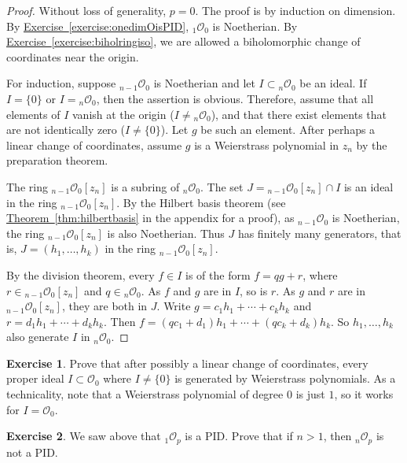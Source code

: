\documentclass[12pt,openany]{book}
\newcommand{\sO}{{\mathscr{O}}}
\theoremstyle{plain}
\theoremstyle{remark}
\theoremstyle{definition}
\newenvironment{exbox}{%
    \def\FrameCommand{\vrule width 1pt \relax\hspace{10pt}}%
    \MakeFramed{\advance\hsize-\width\FrameRestore}%
}{%
    \endMakeFramed
}
\theoremstyle{exercise}
\newtheorem{exercise}{Exercise}[section]
\theoremstyle{example}
\newcommand{\exerciseref}[1]{\hyperref[#1]{Exercise~\ref*{#1}}}
\newcommand{\thmref}[1]{\hyperref[#1]{Theorem~\ref*{#1}}}
\begin{document}
\begin{proof}
Without loss of generality, $p=0$.
The proof is by induction on dimension.
By \exerciseref{exercise:onedimOisPID}, ${}_1\sO_0$ is Noetherian.
By \exerciseref{exercise:biholringiso}, we are allowed a
biholomorphic change of coordinates near the origin.

For induction, suppose ${}_{n-1}\sO_0$ is Noetherian
and let $I \subset {}_n \sO_0$ be an ideal.
If $I = \{ 0 \}$
or $I = {}_n \sO_0$, then the assertion is obvious.  Therefore, assume
that all elements of $I$ vanish at the origin ($I \neq {}_n \sO_0$), and
that there exist elements that are not identically zero
($I \neq \{ 0 \}$).  Let $g$
be such an element.  After perhaps a linear change of coordinates,
assume $g$ is a Weierstrass polynomial in $z_n$
by the preparation theorem.

The ring ${}_{n-1}\sO_0[z_n]$ is a subring of ${}_n \sO_0$.
The set $J= {}_{n-1}\sO_0[z_n] \cap I$ is an ideal in the
ring ${}_{n-1}\sO_0[z_n]$.  By the Hilbert basis theorem (see
\thmref{thm:hilbertbasis} in the appendix for a proof), as
${}_{n-1}\sO_0$ is Noetherian, the ring
${}_{n-1}\sO_0[z_n]$ is also Noetherian.  Thus $J$ has finitely many
generators,
that is, $J = (h_1,\ldots,h_k)$ in the ring ${}_{n-1}\sO_0[z_n]$.

By the division theorem,
every $f \in I$ is of the form $f = qg+r$, where $r \in {}_{n-1}\sO_0[z_n]$
and $q \in {}_n\sO_0$.
As $f$ and $g$ are in $I$, so is $r$.
As $g$ and $r$ are in ${}_{n-1}\sO_0[z_n]$,
they are both in $J$.
Write
$g = c_1 h_1 + \cdots + c_k h_k$ and
$r = d_1 h_1 + \cdots + d_k h_k$.  Then
$f = (qc_1 + d_1) h_1 + \cdots + (qc_k + d_k) h_k$.
So
$h_1,\ldots,h_k$ also generate $I$ in ${}_n \sO_0$.
\end{proof}

\begin{exbox}
\begin{exercise}
Prove that after possibly a linear change of coordinates,
every proper ideal $I \subset \sO_0$ where $I \neq \{ 0 \}$
is generated by Weierstrass polynomials.  As a technicality,
note that a
Weierstrass polynomial of degree $0$ is just $1$, so it works for $I = \sO_0$.
\end{exercise}

\begin{exercise}
We saw above that
${}_1\sO_p$ is a PID\@.  Prove that
if $n > 1$, then ${}_n\sO_p$ is not a PID\@.
\end{exercise}
\end{exbox}
\end{document}
